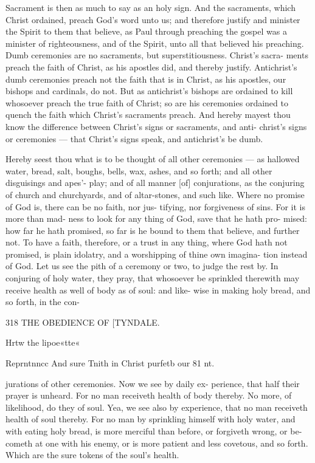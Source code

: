 \documentclass{custom}
\begin{document}
{Sacrament is then as much to say as an holy sign. 
And the sacraments, which Christ ordained, preach God's 
word unto us; and therefore justify and minister the 
Spirit to them that believe, as Paul through preaching the 
gospel was a minister of righteousness, and of the Spirit, 
unto all that believed his preaching. Dumb ceremonies 
are no sacraments, but superstitiousness. Christ's sacra- 
ments preach the faith of Christ, as his apostles did, and 
thereby justify. Antichrist's dumb ceremonies preach not 
the faith that is in Christ, as his apostles, our bishops and 
cardinals, do not. But as antichrist's bishops are ordained 
to kill whosoever preach the true faith of Christ; so are 
his ceremonies ordained to quench the faith which Christ's 
sacraments preach. And hereby mayest thou know the
difference between Christ's signs or sacraments, and anti-
christ's signs or ceremonies — that Christ's signs speak, and
antichrist's be dumb.

Hereby seest thou what is to be thought of all other 
ceremonies — as hallowed water, bread, salt, boughs, bells, 
wax, ashes, and so forth; and all other disguisings and apes'- 
play; and of all manner [of] conjurations, as the conjuring 
of church and churchyards, and of altar-stones, and such like. 
Where no promise of God is, there can be no faith, nor jus- 
tifying, nor forgiveness of sins. For it is more than mad- 
ness to look for any thing of God, save that he hath pro- 
mised: how far he hath promised, so far is he bound to them 
that believe, and further not. To have a faith, therefore,
or a trust in any thing, where God hath not promised, is
plain idolatry, and a worshipping of thine own imagina-
tion instead of God. Let us see the pith of a ceremony
or two, to judge the rest by. In conjuring of holy 
water, they pray, that whosoever be sprinkled therewith 
may receive health as well of body as of soul: and like- 
wise in making holy bread, and so forth, in the con- 


318
THE OBEDIENCE OF
[TYNDALE.

Hrtw the 
lipoe«tte« 

Reprntnncc 
And sure 
Tnith in 
Christ 
purfetb our 
81 nt. 

jurations of other ceremonies. Now we see by daily ex- 
perience, that half their prayer is unheard. For no man 
receiveth health of body thereby. No more, of likelihood, 
do they of soul. Yea, we see also by experience, that 
no man receiveth health of soul thereby. For no man by 
sprinkling himself with holy water, and with eating holy bread, 
is more merciful than before, or forgiveth wrong, or be- 
cometh at one with his enemy, or is more patient and less 
covetous, and so forth. Which are the sure tokens of the 
soul's health. 

}
\end{document}
